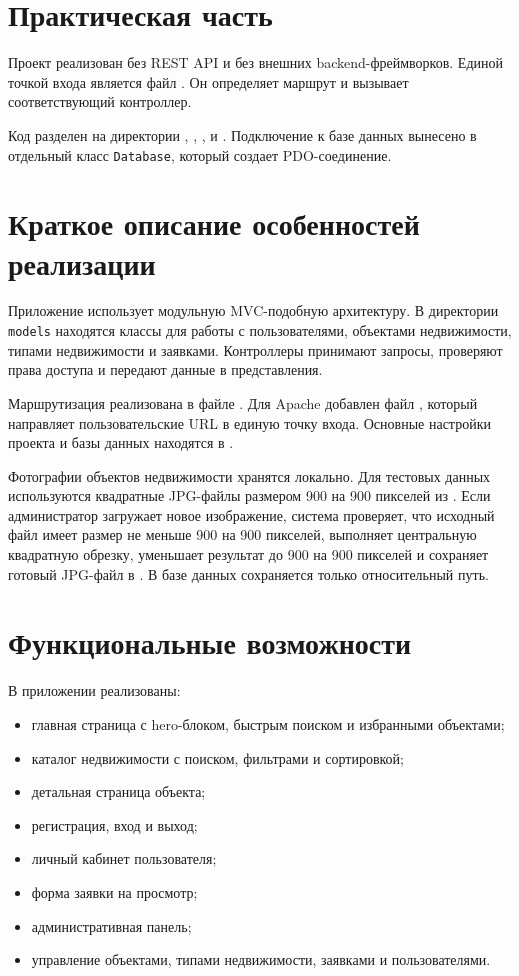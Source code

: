 \documentclass[12pt,a4paper]{article}
\begin{document}
\section{Практическая часть}

Проект реализован без REST API и без внешних backend-фреймворков. Единой точкой входа является файл . Он определяет маршрут и вызывает соответствующий контроллер.

Код разделен на директории , , ,  и . Подключение к базе данных вынесено в отдельный класс \texttt{Database}, который создает PDO-соединение.

\section{Краткое описание особенностей реализации}

Приложение использует модульную MVC-подобную архитектуру. В директории \texttt{models} находятся классы для работы с пользователями, объектами недвижимости, типами недвижимости и заявками. Контроллеры принимают запросы, проверяют права доступа и передают данные в представления.

Маршрутизация реализована в файле . Для Apache добавлен файл , который направляет пользовательские URL в единую точку входа. Основные настройки проекта и базы данных находятся в .

Фотографии объектов недвижимости хранятся локально. Для тестовых данных используются квадратные JPG-файлы размером 900 на 900 пикселей из . Если администратор загружает новое изображение, система проверяет, что исходный файл имеет размер не меньше 900 на 900 пикселей, выполняет центральную квадратную обрезку, уменьшает результат до 900 на 900 пикселей и сохраняет готовый JPG-файл в . В базе данных сохраняется только относительный путь.

\section{Функциональные возможности}

В приложении реализованы:
\begin{itemize}
  \item главная страница с hero-блоком, быстрым поиском и избранными объектами;
  \item каталог недвижимости с поиском, фильтрами и сортировкой;
  \item детальная страница объекта;
  \item регистрация, вход и выход;
  \item личный кабинет пользователя;
  \item форма заявки на просмотр;
  \item административная панель;
  \item управление объектами, типами недвижимости, заявками и пользователями.
\end{itemize}
\end{document}
